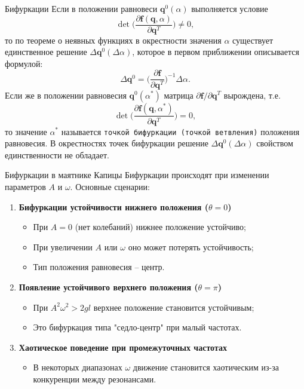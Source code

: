 \documentclass{beamer}
\begin{document}
\begin{frame}{Бифуркации}
    Если в положении равновеси $\mathbf{q}^0(\alpha)$ выполняется условие
    $$
    \det{\Big(\frac{\partial\mathbf{f}(\mathbf{q}, \alpha)}{\partial\mathbf{q}^T}\Big)}\neq 0,
    $$
    то по теореме о неявных функциях в окрестности значения $\alpha$ существует единственное решение $\Delta\mathbf{q}^0(\Delta\alpha)$, которое в первом приближении описывается формулой:
    $$
    \Delta\mathbf{q}^0=\Big(\frac{\partial\mathbf{f}}{\partial\mathbf{q}^T} \Big)^{-1}\Delta\alpha.
    $$
    Если же в положении равновесия $\mathbf{q}^0(\alpha^*)$ матрица $\partial\mathbf{f}/\partial\mathbf{q}^T$ вырождена, т.е.
    $$
    \det{\Big(\frac{\partial\mathbf{f}(\mathbf{q}, \alpha^*)}{\partial\mathbf{q}^T} \Big)}=0,
    $$
    то значение $\alpha^*$ называется \texttt{точкой бифуркации (точкой ветвления)} положения равновесия. В окрестностях точек бифуркации решение $\Delta\mathbf{q}^0(\Delta\alpha)$ свойством единственности не обладает.
\end{frame}

\begin{frame}{Бифуркации в маятнике Капицы}
    Бифуркации происходят при изменении параметров $A$ и $\omega$. Основные сценарии:
    \begin{enumerate}
        \item \textbf{Бифуркации устойчивости нижнего положения ($\theta=0$)}
        \begin{itemize}
            \item При $A=0$ (нет колебаний) нижнее положение устойчиво;
            \item При увеличении $A$ или $\omega$ оно может потерять устойчивость;
            \item Тип положения равновесия -- центр.
        \end{itemize}
        \item \textbf{Появление устойчивого верхнего положения ($\theta=\pi$)}
        \begin{itemize}
            \item При $A^2\omega^2>2gl$ верхнее положение становится устойчивым;
            \item Это бифуркация типа "седло-центр" при малый частотах.
        \end{itemize}
        \item \textbf{Хаотическое поведение при промежуточных частотах}
        \begin{itemize}
            \item В некоторых диапазонах $\omega$ движение становится хаотическим из-за конкуренции между резонансами.
        \end{itemize}
    \end{enumerate}
\end{frame}
\end{document}
